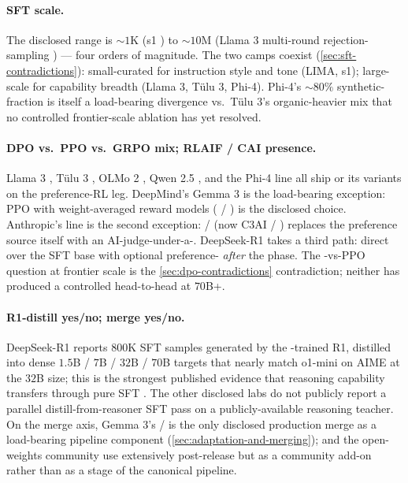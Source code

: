 \paragraph{SFT scale.}
The disclosed range is $\sim\!1$K (s1 \citep{s1-2025}) to $\sim 10$M
(Llama 3 multi-round rejection-sampling \citep{meta-llama3}) --- four
orders of magnitude. The two camps coexist (\cref{sec:sft-contradictions}):
small-curated for instruction style and tone (LIMA, s1); large-scale
for capability breadth (Llama 3, Tülu 3, Phi-4). Phi-4's $\sim\!80\%$
synthetic-fraction \citep[\S 1]{phi4} is itself a load-bearing
divergence vs.\ Tülu 3's organic-heavier mix \citep{tulu3} that no
controlled frontier-scale ablation has yet resolved.

\paragraph{DPO vs.\ PPO vs.\ GRPO mix; RLAIF / CAI presence.}
Llama 3 \citep{meta-llama3}, Tülu 3 \citep{tulu3}, OLMo 2
\citep{olmo2}, Qwen 2.5 \citep{qwen2-5}, and the Phi-4 line
\citep{phi4} all ship  \citep{rafailov2023-dpo} or its variants
on the preference-RL leg. DeepMind's Gemma 3 \citep{gemma3} is the
load-bearing exception: PPO with weight-averaged reward models
( \citep{warm-2024} /  \citep{warp-2024}) is the disclosed
choice. Anthropic's  line is the second exception:  / 
\citep{bai2022-cai} (now C3AI \citep{c3ai-2025} / 
\citep{r-cai-2026}) replaces the preference source itself with an
AI-judge-under-a-. DeepSeek-R1 takes a third path:
direct  over the SFT base \citep{deepseek-r1} with optional
preference- \emph{after} the  phase. The -vs-PPO question at
frontier scale is the \cref{sec:dpo-contradictions} contradiction;
neither has produced a controlled head-to-head at $70$B+.

\paragraph{R1-distill yes/no; merge yes/no.}
DeepSeek-R1 \citep{deepseek-r1} reports $800$K SFT samples generated
by the -trained R1, distilled into dense $1.5$B / $7$B / $32$B /
$70$B targets that nearly match o1-mini on AIME at the $32$B size;
this is the strongest published evidence that reasoning capability
transfers through pure SFT \citep[\S 4]{deepseek-r1}. The other
disclosed labs do not publicly report a parallel distill-from-reasoner
SFT pass on a publicly-available reasoning teacher. On the merge axis,
Gemma 3's / \citep{warm-2024,warp-2024} is the only disclosed
production merge as a load-bearing pipeline component
(\cref{sec:adaptation-and-merging});  and the open-weights
community use  \citep{mergekit2024} extensively post-release
but as a community add-on rather than as a stage of the canonical
pipeline.

